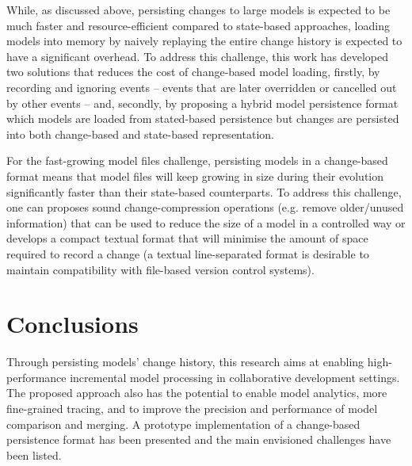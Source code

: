 While, as discussed above, persisting changes to large models is expected to be much faster and resource-efficient compared to state-based approaches, loading models into memory by naively replaying the entire change history is expected to have a significant overhead. To address this challenge, this work has developed two solutions that reduces the cost of change-based model loading, firstly, by recording and ignoring events -- events that are later overridden or cancelled out by other events -- and, secondly, by proposing a hybrid model persistence format which models are loaded from stated-based persistence but changes are persisted into both change-based and state-based representation. 

For the fast-growing model files challenge, persisting models in a change-based format means that model files will keep growing in size during their evolution significantly faster than their state-based counterparts. To address this challenge, one can proposes sound change-compression operations (e.g. remove older/unused information) that can be used to reduce the size of a model in a controlled way or develops a compact textual format that will minimise the amount of space required to record a change (a textual line-separated format is desirable to maintain compatibility with file-based version control systems).  

\section{Conclusions}
\label{sec:conclusions_2}
Through persisting models' change history, this research aims at enabling high-performance incremental model processing in collaborative development settings. The proposed approach also has the potential to enable model analytics, more fine-grained tracing, and to improve the precision and performance of model comparison and merging. A prototype implementation of a change-based persistence format has been presented and the main envisioned challenges have been listed. 